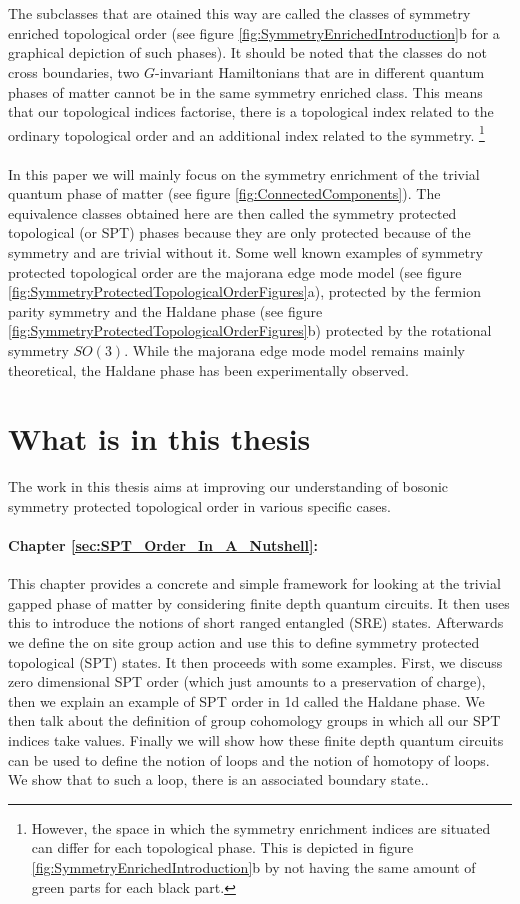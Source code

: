 \\\\
The subclasses that are otained this way are called the classes of symmetry enriched topological order (see figure \ref{fig:SymmetryEnrichedIntroduction}b for a graphical depiction of such phases). It should be noted that the classes do not cross boundaries, two $G$-invariant Hamiltonians that are in different quantum phases of matter cannot be in the same symmetry enriched class. This means that our topological indices factorise, there is a topological index related to the ordinary topological order and an additional index related to the symmetry. \footnote{However, the space in which the symmetry enrichment indices are situated can differ for each topological phase. This is depicted in figure \ref{fig:SymmetryEnrichedIntroduction}b by not having the same amount of green parts for each black part.}
\\\\
In this paper we will mainly focus on the symmetry enrichment of the trivial quantum phase of matter (see figure \ref{fig:ConnectedComponents}). The equivalence classes obtained here are then called the symmetry protected topological (or SPT) phases because they are only protected because of the symmetry and are trivial without it. Some well known examples of symmetry protected topological order are the majorana edge mode model (see figure \ref{fig:SymmetryProtectedTopologicalOrderFigures}a), protected by the fermion parity symmetry and the Haldane phase (see figure \ref{fig:SymmetryProtectedTopologicalOrderFigures}b) protected by the rotational symmetry $SO(3)$. While the majorana edge mode model remains mainly theoretical, the Haldane phase has been experimentally\cite{sompet2022realizing} observed.

\section{What is in this thesis}
The work in this thesis aims at improving our understanding of bosonic symmetry protected topological order in various specific cases.
\paragraph{Chapter \ref{sec:SPT_Order_In_A_Nutshell}:}This chapter provides a concrete and simple framework for looking at the trivial gapped phase of matter by considering finite depth quantum circuits. It then uses this to introduce the notions of short ranged entangled (SRE) states. Afterwards we define the on site group action and use this to define symmetry protected topological (SPT) states. It then proceeds with some examples. First, we discuss zero dimensional SPT order (which just amounts to a preservation of charge), then we explain an example of SPT order in 1d called the Haldane phase. We then talk about the definition of group cohomology groups in which all our SPT indices take values. Finally we will show how these finite depth quantum circuits can be used to define the notion of loops and the notion of homotopy of loops. We show that to such a loop, there is an associated boundary state..
